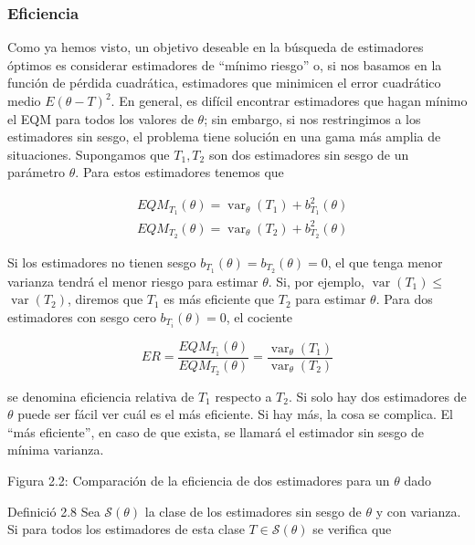 \documentclass[
]{article}
\begin{document}
\subsubsection{Eficiencia}\label{eficiencia}

Como ya hemos visto, un objetivo deseable en la búsqueda de estimadores óptimos es considerar estimadores de ``mínimo riesgo'' o, si nos basamos en la función de pérdida cuadrática, estimadores que minimicen el error cuadrático medio \(E(\theta-T)^{2}\).
En general, es difícil encontrar estimadores que hagan mínimo el EQM para todos los valores de \(\theta\); sin embargo, si nos restringimos a los estimadores sin sesgo, el problema tiene solución en una gama más amplia de situaciones. Supongamos que \(T_{1}, T_{2}\) son dos estimadores sin sesgo de un parámetro \(\theta\). Para estos estimadores tenemos que

\[
\begin{aligned}
& E Q M_{T_{1}}(\theta)=\operatorname{var}_{\theta}\left(T_{1}\right)+b_{T_{1}}^{2}(\theta) \\
& E Q M_{T_{2}}(\theta)=\operatorname{var}_{\theta}\left(T_{2}\right)+b_{T_{2}}^{2}(\theta)
\end{aligned}
\]

Si los estimadores no tienen sesgo \(b_{T_{1}}(\theta)=b_{T_{2}}(\theta)=0\), el que tenga menor varianza tendrá el menor riesgo para estimar \(\theta\). Si, por ejemplo, \(\operatorname{var}\left(T_{1}\right) \leq\) \(\operatorname{var}\left(T_{2}\right)\), diremos que \(T_{1}\) es más eficiente que \(T_{2}\) para estimar \(\theta\).
Para dos estimadores con sesgo cero \(b_{T_{i}}(\theta)=0\), el cociente

\[
E R=\frac{E Q M_{T_{1}}(\theta)}{E Q M_{T_{2}}(\theta)}=\frac{\operatorname{var}_{\theta}\left(T_{1}\right)}{\operatorname{var}_{\theta}\left(T_{2}\right)}
\]

se denomina eficiencia relativa de \(T_{1}\) respecto a \(T_{2}\). Si solo hay dos estimadores de \(\theta\) puede ser fácil ver cuál es el más eficiente. Si hay más, la cosa se complica. El ``más eficiente'', en caso de que exista, se llamará el estimador sin sesgo de mínima varianza.

Figura 2.2: Comparación de la eficiencia de dos estimadores para un \(\theta\) dado

Definició 2.8 Sea \(\mathcal{S}(\theta)\) la clase de los estimadores sin sesgo de \(\theta\) y con varianza. Si para todos los estimadores de esta clase \(T \in \mathcal{S}(\theta)\) se verifica que
\end{document}
